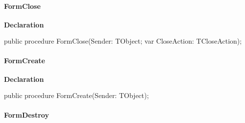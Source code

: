 \documentclass{report}
\newif\ifpdf
\begin{document}
\paragraph*{FormClose}\hspace*{\fill}

\label{swcatalog.TSCForm-FormClose}
\begin{list}{}{
\setlength{\itemindent}{0cm}
\setlength{\listparindent}{0cm}
\setlength{\leftmargin}{\evensidemargin}
\addtolength{\leftmargin}{\tmplength}
\settowidth{\labelsep}{X}
\addtolength{\leftmargin}{\labelsep}
\setlength{\labelwidth}{\tmplength}
}
\item[\textbf{Declaration}\hfill]
\ifpdf
\begin{flushleft}
\fi
\begin{ttfamily}
public procedure FormClose(Sender: TObject; var CloseAction: TCloseAction);\end{ttfamily}

\ifpdf
\end{flushleft}
\fi

\end{list}
\paragraph*{FormCreate}\hspace*{\fill}

\label{swcatalog.TSCForm-FormCreate}
\begin{list}{}{
\setlength{\itemindent}{0cm}
\setlength{\listparindent}{0cm}
\setlength{\leftmargin}{\evensidemargin}
\addtolength{\leftmargin}{\tmplength}
\settowidth{\labelsep}{X}
\addtolength{\leftmargin}{\labelsep}
\setlength{\labelwidth}{\tmplength}
}
\item[\textbf{Declaration}\hfill]
\ifpdf
\begin{flushleft}
\fi
\begin{ttfamily}
public procedure FormCreate(Sender: TObject);\end{ttfamily}

\ifpdf
\end{flushleft}
\fi

\end{list}
\paragraph*{FormDestroy}\hspace*{\fill}
\end{document}
